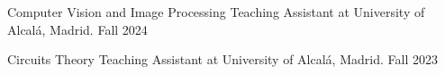 


\begin{cvhonors}


    \cvhonor
    {Computer Vision and Image Processing} %
    {Teaching Assistant at University of Alcalá, Madrid.} %
    {} %
    {Fall 2024} %

    \cvhonor
    {Circuits Theory} %
    {Teaching Assistant at University of Alcalá, Madrid.} %
    {} %
    {Fall 2023} %

\end{cvhonors}
